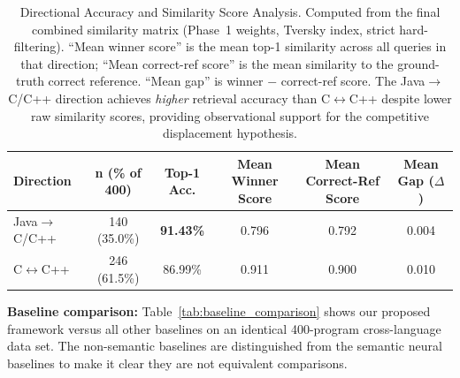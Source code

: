 \begin{table}[!t]
\caption{Directional Accuracy and Similarity Score Analysis. Computed from the final combined similarity matrix (Phase~1 weights, Tversky index, strict hard-filtering). ``Mean winner score'' is the mean top-1 similarity across all queries in that direction; ``Mean correct-ref score'' is the mean similarity to the ground-truth correct reference. ``Mean gap'' is winner $-$ correct-ref score. The Java$\rightarrow$C/C++ direction achieves \textit{higher} retrieval accuracy than C$\leftrightarrow$C++ despite lower raw similarity scores, providing observational support for the competitive displacement hypothesis.}
\label{tab:displacement}
\centering
\begin{tabular}{|l|c|c|c|c|c|}
\hline
\textbf{Direction} & \textbf{n (\% of 400)} & \textbf{Top-1 Acc.} & \textbf{Mean Winner Score} & \textbf{Mean Correct-Ref Score} & \textbf{Mean Gap ($\Delta$)} \\
\hline
Java$\rightarrow$C/C++ & 140 (35.0\%) & \textbf{91.43\%} & 0.796 & 0.792 & 0.004 \\
C$\leftrightarrow$C++  & 246 (61.5\%) & 86.99\%          & 0.911 & 0.900 & 0.010 \\
\hline
\end{tabular}
\end{table}

\textbf{Baseline comparison:} Table~\ref{tab:baseline_comparison} shows our proposed framework versus all other baselines on an identical 400-program cross-language data set. The non-semantic baselines are distinguished from the semantic neural baselines to make it clear they are not equivalent comparisons.

